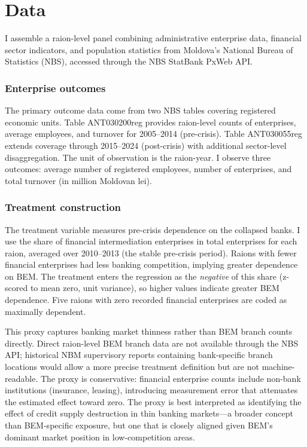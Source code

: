\documentclass[12pt]{article}
\begin{document}
\section{Data}
\label{sec:data}

I assemble a raion-level panel combining administrative enterprise data, financial sector indicators, and population statistics from Moldova's National Bureau of Statistics (NBS), accessed through the NBS StatBank PxWeb API.

\subsubsection*{Enterprise outcomes} The primary outcome data come from two NBS tables covering registered economic units. Table ANT030200reg provides raion-level counts of enterprises, average employees, and turnover for 2005--2014 (pre-crisis). Table ANT030055reg extends coverage through 2015--2024 (post-crisis) with additional sector-level disaggregation. The unit of observation is the raion-year. I observe three outcomes: average number of registered employees, number of enterprises, and total turnover (in million Moldovan lei).

\subsubsection*{Treatment construction} The treatment variable measures pre-crisis dependence on the collapsed banks. I use the share of financial intermediation enterprises in total enterprises for each raion, averaged over 2010--2013 (the stable pre-crisis period). Raions with fewer financial enterprises had less banking competition, implying greater dependence on BEM. The treatment enters the regression as the \emph{negative} of this share (z-scored to mean zero, unit variance), so higher values indicate greater BEM dependence. Five raions with zero recorded financial enterprises are coded as maximally dependent.

This proxy captures banking market thinness rather than BEM branch counts directly. Direct raion-level BEM branch data are not available through the NBS API; historical NBM supervisory reports containing bank-specific branch locations would allow a more precise treatment definition but are not machine-readable. The proxy is conservative: financial enterprise counts include non-bank institutions (insurance, leasing), introducing measurement error that attenuates the estimated effect toward zero. The proxy is best interpreted as identifying the effect of credit supply destruction in thin banking markets---a broader concept than BEM-specific exposure, but one that is closely aligned given BEM's dominant market position in low-competition areas.
\end{document}
